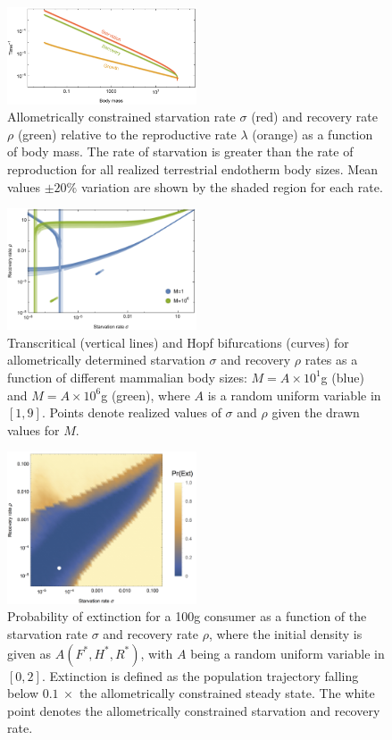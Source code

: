 \documentclass{pnastwo}
\begin{document}
\begin{figure}
\centering
\includegraphics[width=0.5\textwidth]{fig_Rates.pdf}
\caption{ 
Allometrically constrained starvation rate $\sigma$ (red) and recovery rate $\rho$ (green) relative to the reproductive rate $\lambda$ (orange) as a function of body mass.  
The rate of starvation is greater than the rate of reproduction for all realized terrestrial endotherm body sizes.
Mean values $\pm 20\%$ variation are shown by the shaded region for each rate.
}
\label{fig:gvs}
\end{figure}


\begin{figure}
\centering
\includegraphics[width=0.5\textwidth]{fig_DataHopf.pdf}
\caption{ Transcritical (vertical lines) and Hopf bifurcations (curves) for
  allometrically determined starvation $\sigma$ and recovery $\rho$ rates as
  a function of different mammalian body sizes: $M=A\times10^1$g (blue) and
  $M=A\times10^6$g (green), where $A$ is a random uniform variable in $[1,9]$.
  Points denote realized values of $\sigma$ and $\rho$ given the drawn values for $M$.
  }
\label{fig:hopf}
\end{figure}

\begin{figure}
\centering
\includegraphics[width=0.5\textwidth]{fig_ExtinctionAllometric.jpg}
\caption{ Probability of extinction for a 100g consumer as a function of the starvation rate $\sigma$ and recovery rate $\rho$, where the initial density is given as $A(F^*,H^*,R^*)$, with
  $A$ being a random uniform variable in $[0,2]$.  Extinction is defined as the
  population trajectory falling below $0.1~\times$ the allometrically
  constrained steady state. The white point denotes the allometrically constrained starvation and recovery rate.}
\label{fig:ext}
\end{figure} 
 
\end{document}
